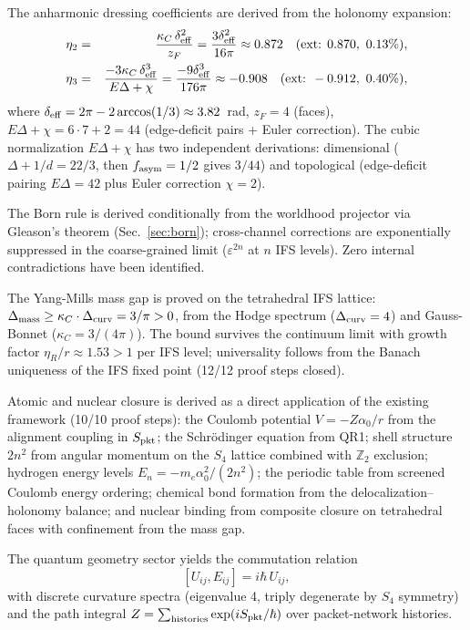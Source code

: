 \documentclass[11pt,twocolumn]{article}
\begin{document}
The anharmonic dressing coefficients are derived from the holonomy expansion:
\begin{eqnarray}
\eta_2 &=& \frac{\kappa_C\,\delta_{\rm eff}^2}{z_F} = \frac{3\delta_{\rm eff}^2}{16\pi} \approx 0.872 \quad(\text{ext: } 0.870,\ 0.13\%), \label{eq:eta2} \\
\eta_3 &=& \frac{-3\kappa_C\,\delta_{\rm eff}^3}{E\Delta + \chi} = \frac{-9\delta_{\rm eff}^3}{176\pi} \approx -0.908 \quad(\text{ext: } -0.912,\ 0.40\%), \label{eq:eta3}
\end{eqnarray}
where $\delta_{\rm eff} = 2\pi - 2\arccos(1/3) \approx 3.82$~rad, $z_F = 4$ (faces), $E\Delta + \chi = 6\cdot7 + 2 = 44$ (edge-deficit pairs + Euler correction).
The cubic normalization $E\Delta + \chi$ has two independent derivations: dimensional ($\Delta + 1/d = 22/3$, then $f_{\rm asym} = 1/2$ gives $3/44$) and topological (edge-deficit pairing $E\Delta = 42$ plus Euler correction $\chi = 2$).

The Born rule is derived conditionally from the worldhood projector via Gleason's theorem (Sec.~\ref{sec:born}); cross-channel corrections are exponentially suppressed in the coarse-grained limit ($\varepsilon^{2n}$ at $n$ IFS levels).
Zero internal contradictions have been identified.\cite{gravityprog}

The Yang-Mills mass gap is proved on the tetrahedral IFS lattice: $\Delta_{\rm mass} \geq \kappa_C \cdot \Delta_{\rm curv} = 3/\pi > 0$, from the Hodge spectrum ($\Delta_{\rm curv} = 4$) and Gauss-Bonnet ($\kappa_C = 3/(4\pi)$).  The bound survives the continuum limit with growth factor $\eta_R/r \approx 1.53 > 1$ per IFS level; universality follows from the Banach uniqueness of the IFS fixed point (12/12 proof steps closed).

Atomic and nuclear closure is derived as a direct application of the existing framework (10/10 proof steps): the Coulomb potential $V = -Z\alpha_0/r$ from the alignment coupling in $S_{\rm pkt}$; the Schr\"odinger equation from QR1; shell structure $2n^2$ from angular momentum on the $S_4$ lattice combined with $\mathbb{Z}_2$ exclusion; hydrogen energy levels $E_n = -m_e\alpha_0^2/(2n^2)$; the periodic table from screened Coulomb energy ordering; chemical bond formation from the delocalization--holonomy balance; and nuclear binding from composite closure on tetrahedral faces with confinement from the mass gap.

The quantum geometry sector yields the commutation relation
\begin{equation}
\label{eq:quantum-commutator}
[U_{ij}, E_{ij}] = i\hbar\,U_{ij},
\end{equation}
with discrete curvature spectra (eigenvalue 4, triply degenerate by $S_4$ symmetry) and the path integral $Z = \sum_{\rm histories}\exp(iS_{\rm pkt}/\hbar)$ over packet-network histories.
\end{document}

